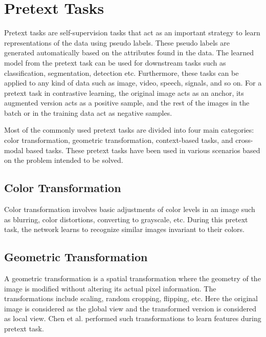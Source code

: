 \documentclass[conference]{IEEEtran}
\begin{document}
\section{Pretext Tasks}
Pretext tasks are self-supervision tasks that act as an important strategy to learn representations of the data using pseudo labels.
These pseudo labels are generated automatically based on the attributes found in the data. The learned model from the pretext task can be used for downstream tasks such as classification, segmentation, detection etc.
Furthermore, these tasks can be applied to any kind of data such as image, video, speech, signals, and so on.
For a pretext task in contrastive learning, the original image acts as an anchor, its augmented version acts as a positive sample, and the rest of the images in the batch or in the training data act as negative samples.

Most of the commonly used pretext tasks are divided into four main categories: color transformation, geometric transformation, context-based tasks, and cross-modal based tasks.
These pretext tasks have been used in various scenarios based on the problem intended to be solved.

\subsection{Color Transformation}
Color transformation involves basic adjustments of color levels in an image such as blurring, color distortions, converting to grayscale, etc.
During this pretext task, the network learns to recognize similar images invariant to their colors.

\subsection{Geometric Transformation}
A geometric transformation is a spatial transformation where the geometry of the image is modified without altering its actual pixel information.
The transformations include scaling, random cropping, flipping, etc. Here the original image is considered as the global view and the transformed version is considered as local view.
Chen et al. performed such transformations to learn features during pretext task.
\end{document}
